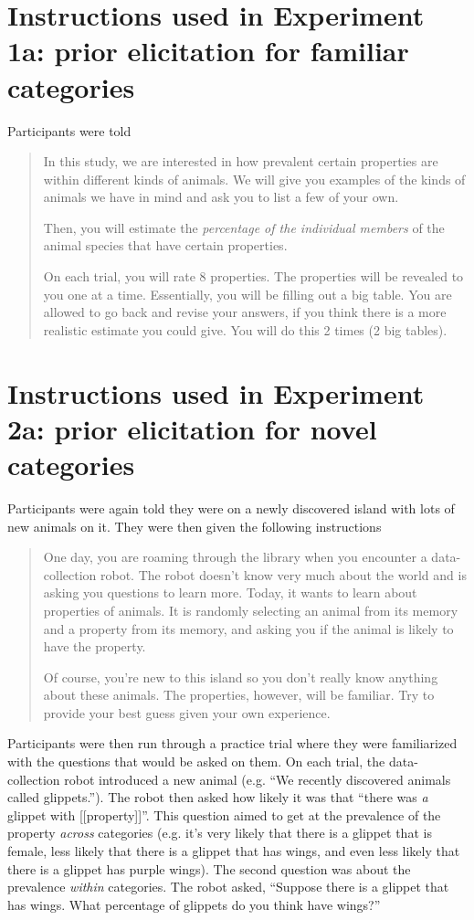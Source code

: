 \documentclass[10pt,letterpaper]{article}
\begin{document}
\section{Instructions used in Experiment 1a: prior elicitation for familiar categories}
\label{sec:prior1instruct}

Participants were told 
\begin{quote}
In this study, we are interested in how prevalent certain properties are within different kinds of animals. We will give you examples of the kinds of animals we have in mind and ask you to list a few of your own.

Then, you will estimate the \emph{percentage of the individual members} of the animal species that have certain properties.

On each trial, you will rate 8 properties. The properties will be revealed to you one at a time. Essentially, you will be filling out a big table. You are allowed to go back and revise your answers, if you think there is a more realistic estimate you could give. You will do this 2 times (2 big tables). 

\end{quote}


\section{Instructions used in Experiment 2a: prior elicitation for novel categories}
\label{sec:prior2instruct}

Participants were again told they were on a newly discovered island with lots of new animals on it. They were then given the following instructions

\begin{quote}
One day, you are roaming through the library when you encounter a data-collection robot. The robot doesn't know very much about the world and is asking you questions to learn more. Today, it wants to learn about properties of animals. It is randomly selecting an animal from its memory and a property from its memory, and asking you if the animal is likely to have the property.

Of course, you're new to this island so you don't really know anything about these animals. The properties, however, will be familiar. Try to provide your best guess given your own experience.
\end{quote}

Participants were then run through a practice trial where they were familiarized with the questions that would be asked on them. 
On each trial, the data-collection robot introduced a new animal (e.g. ``We recently discovered animals called glippets.''). 
The robot then asked how likely it was that ``there was \emph{a} glippet with [[property]]''. 
This question aimed to get at the prevalence of the property \emph{across} categories (e.g. it's very likely that there is a glippet that is female, less likely that there is a glippet that has wings, and even less likely that there is a glippet has purple wings). 
The second question was about the prevalence \emph{within} categories. The robot asked, ``Suppose there is a glippet that has wings. What percentage of glippets do you think have wings?''
\end{document}
